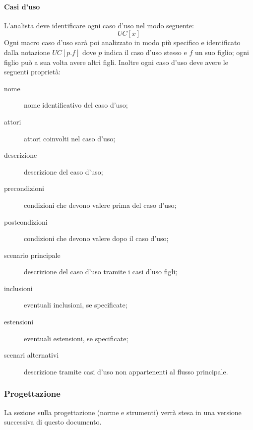 		\paragraph{Casi d'uso}
		L'analista deve identificare ogni caso d'uso nel modo seguente:
			\[UC[x]\]
		Ogni macro caso d'uso sarà poi analizzato in modo più specifico e identificato dalla notazione $UC[p.f]$ dove $p$ indica il caso d'uso stesso e $f$ un suo figlio; ogni figlio può a sua volta avere altri figli. Inoltre ogni caso d'uso deve avere le seguenti proprietà:
		\begin{description}
			\item[nome] nome identificativo del caso d'uso;
			\item[attori] attori coinvolti nel caso d'uso;
			\item[descrizione] descrizione del caso d'uso;
			\item[precondizioni] condizioni che devono valere prima del caso d'uso;%
			\item[postcondizioni] condizioni che devono valere dopo il caso d'uso;%
			\item[scenario principale] descrizione del caso d'uso tramite i casi d'uso figli;
			\item[inclusioni] eventuali inclusioni, se specificate;
			\item[estensioni] eventuali estensioni, se specificate;
			\item[scenari alternativi] descrizione tramite casi d'uso non appartenenti al flusso principale.
		\end{description}
	\subsubsection{Progettazione}
	La sezione sulla progettazione (norme e strumenti) verrà stesa in una versione successiva di questo documento.
